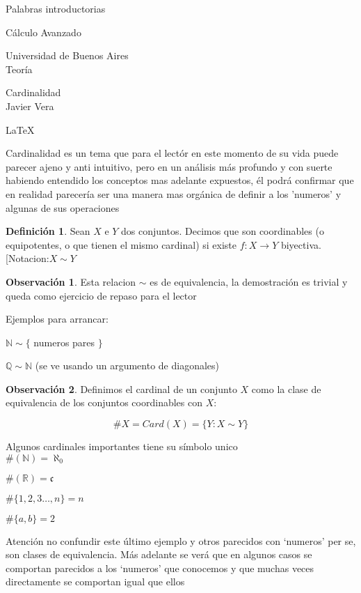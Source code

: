 \documentclass[12pt]{article}
\newcommand{\n}{\aleph_{0}}
\newcommand{\Q}{\mathbb{Q}}
\newcommand{\R}{\mathbb{R}}
\newcommand{\N}{\mathbb{N}}
\newcommand{\ra}{\rightarrow}
\theoremstyle{definition}
\newtheorem{definition}{Definición}[section]
\newtheorem*{remark}{Observación}
\begin{document}
\thispagestyle{empty}

Palabras introductorias

\newpage
\thispagestyle{empty}

Cálculo Avanzado 

Universidad de Buenos Aires \\

Teoría

Cardinalidad \\

Javier Vera

\LaTeX 

\newpage
\thispagestyle{empty}
Cardinalidad es un tema que para el lectór en este momento de su vida puede parecer ajeno y anti intuitivo, pero en un análisis más profundo y con suerte habiendo entendido los conceptos mas adelante expuestos, él podrá confirmar que en realidad parecería ser una manera mas orgánica de definir a los 'numeros' y algunas de sus operaciones

\begin{definition}
  Sean $X$ e $Y$ dos conjuntos. Decimos que son coordinables (o equipotentes, o que tienen el mismo cardinal) si existe $f: X \ra Y$ biyectiva. [Notacion:$X \sim Y$
  \end{definition}
    \begin{remark}
      Esta relacion $\sim$ es de equivalencia, la demostración es trivial y queda como ejercicio de repaso para el lector
    \end{remark}
Ejemplos para arrancar:

\begin{center} $\N \sim \{$ numeros pares $\}$ \end{center}
\begin{center} $\Q \sim \N$ (se ve usando un argumento de diagonales)\end{center} 

\begin{remark}
  Definimos el cardinal de un conjunto $X$ como la clase de equivalencia de los conjuntos coordinables con $X$:

  $$ \# X = Card(X) = \{Y : X \sim Y\}$$

 Algunos cardinales importantes tiene su símbolo unico \\

 $\# (\N) = \n$
 
 $\#(\R) = \mathfrak{c}$

 $\# \{1,2,3 \dots ,n\} = n$

 $\# \{a,b\} = 2$ 

 Atención no confundir este último ejemplo y otros parecidos con `numeros' per se, son clases de equivalencia. Más adelante se verá que en algunos casos se comportan parecidos a los `numeros' que conocemos y que muchas veces directamente se comportan igual que ellos 
\end{remark}
\end{document}

